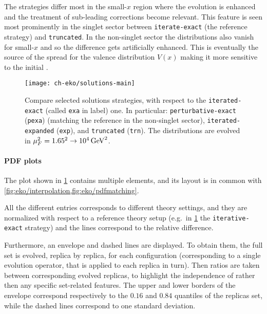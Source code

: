 The strategies differ most in the small-$x$ region where the \pdf{} evolution is
enhanced and the treatment of sub-leading corrections become relevant.
This feature is seen most prominently in the singlet sector between
\texttt{iterate-exact} (the reference strategy) and \texttt{truncated}.
In the non-singlet sector the distributions also vanish for small-$x$
and so the difference gets artificially enhanced.
This is eventually the source of the spread for the valence distribution $V(x)$
making it more sensitive to the initial \pdf{}.

\begin{figure}
    \centering
    \texttt{[image: ch-eko/solutions-main]}
    \caption{Compare selected solutions strategies, with respect to the
        \texttt{iterated-exact} (called \texttt{exa} in label) one. In
        particular: \texttt{perturbative-exact} (\texttt{pexa}) (matching
        the reference in the non-singlet sector),
        \texttt{iterated-expanded} (\texttt{exp}), and \texttt{truncated}
        (\texttt{trn}).
        The distributions are evolved in $\muF^2=\SI[parse-numbers=false]{1.65^2\to 10^4}{\GeV^2}$.}
    \label{fig:eko/solutions}
\end{figure}

\paragraph{PDF plots} The \pdf{} plot shown in \cref{fig:eko/solutions} contains
multiple elements, and its layout is in common with
\cref{fig:eko/interpolation,fig:eko/pdfmatching}.

All the different entries corresponds to different theory settings, and they
are normalized with respect to a reference theory setup
(e.g.\ in \cref{fig:eko/solutions} the \texttt{iterative-exact} strategy)
and the lines correspond to the relative difference.

Furthermore, an envelope and dashed lines are displayed.
To obtain them, the full \pdf{} set is evolved, replica by replica, for each
configuration (corresponding to a single evolution operator, that is applied to
each replica in turn).
Then ratios are taken between corresponding evolved replicas, to highlight
the \pdf{} independence of \eko{} rather then any specific set-related features.
The upper and lower borders of the envelope correspond respectively
to the $0.16$ and $0.84$ quantiles of the replicas set,
while the dashed lines correspond to one standard deviation.
